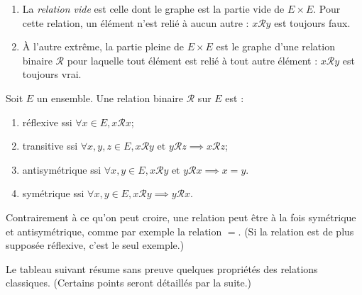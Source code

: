 \begin{exemple}[Zérologie]
\begin{enumerate}
\item La \emph{relation vide} est celle dont le graphe est la partie vide de $E\times E$. Pour cette relation, un élément n'est relié à aucun autre : $x\mathcal R y$ est toujours faux.
\item À l'autre extrême, la partie pleine de $E\times E$ est le graphe d'une relation binaire $\mathcal R$ pour laquelle tout élément est relié à tout autre élément : $x\mathcal R y$ est toujours vrai.
\end{enumerate}
\end{exemple}

\begin{definition}
Soit $E$ un ensemble. Une relation binaire ${\mathcal R}$ sur $E$ est : 
\begin{enumerate}
\item réflexive ssi $\forall x\in E, x{\mathcal R}x$;
\item transitive ssi $\forall x, y, z\in E, x\mathcal Ry \text{ et } y{\mathcal R}z \implies x{\mathcal R}z$;
\item antisymétrique ssi $\forall x, y \in E, x{\mathcal R}y\text{ et } y{\mathcal R}x \implies x=y$.
\item symétrique ssi $\forall x, y\in E, x\mathcal R y \implies y\mathcal R x$.
\end{enumerate}
\end{definition}

\begin{attention}
Contrairement à ce qu'on peut croire, une relation peut être à la fois symétrique et antisymétrique, comme par exemple la relation $=$. (Si la relation est de plus supposée réflexive, c'est le seul exemple.)
\end{attention}

Le tableau suivant résume sans preuve quelques propriétés des relations classiques. (Certains points seront détaillés par la suite.)\\

